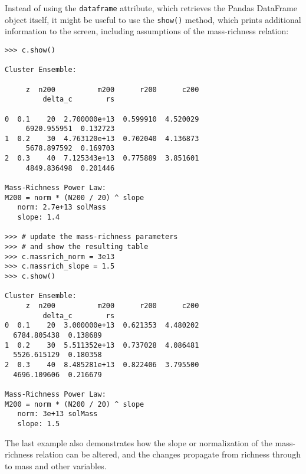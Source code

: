 \documentclass[twocolumn]{aastex6}
\newcommand{\code}{\lstinline[style=codeintext]}
\begin{document}
Instead of using the \code{dataframe} attribute, which retrieves the Pandas DataFrame object itself, it might be useful to use the \code{show()} method, which prints additional information to the screen, including assumptions of the mass-richness relation:%
\begin{verbatim}
>>> c.show()

Cluster Ensemble:

     z  n200          m200      r200      c200
         delta_c        rs

0  0.1    20  2.700000e+13  0.599910  4.520029
     6920.955951  0.132723
1  0.2    30  4.763120e+13  0.702040  4.136873
     5678.897592  0.169703
2  0.3    40  7.125343e+13  0.775889  3.851601
     4849.836498  0.201446

Mass-Richness Power Law:
M200 = norm * (N200 / 20) ^ slope
   norm: 2.7e+13 solMass
   slope: 1.4

>>> # update the mass-richness parameters
>>> # and show the resulting table
>>> c.massrich_norm = 3e13
>>> c.massrich_slope = 1.5
>>> c.show()

Cluster Ensemble:
     z  n200          m200      r200      c200
         delta_c        rs
0  0.1    20  3.000000e+13  0.621353  4.480202
  6784.805438  0.138689
1  0.2    30  5.511352e+13  0.737028  4.086481
  5526.615129  0.180358
2  0.3    40  8.485281e+13  0.822406  3.795500
  4696.109606  0.216679

Mass-Richness Power Law:
M200 = norm * (N200 / 20) ^ slope
   norm: 3e+13 solMass
   slope: 1.5

\end{verbatim}
The last example also demonstrates how the slope or normalization of the mass-richness relation can be altered, and the changes propagate from richness through to mass and other variables.
\end{document}
